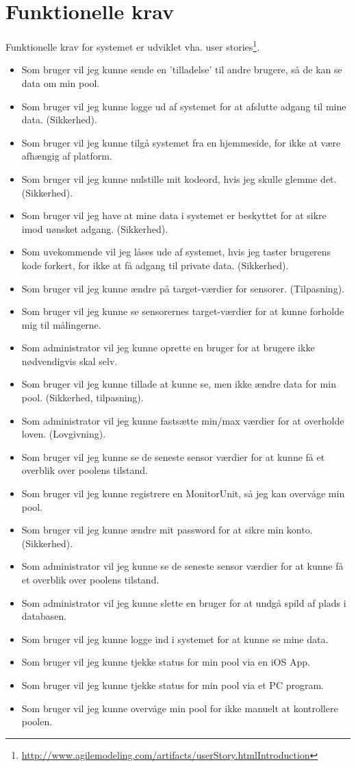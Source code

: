 \section{Funktionelle krav}
Funktionelle krav for systemet er udviklet vha. user stories\footnote{\url{http://www.agilemodeling.com/artifacts/userStory.htmlIntroduction}}.

\begin{itemize}
	\item Som bruger vil jeg kunne sende en ’tilladelse’ til andre brugere, så de kan se data om min pool.
	\item Som bruger vil jeg kunne logge ud af systemet for at afslutte adgang til mine data. (Sikkerhed).
	\item Som bruger vil jeg kunne tilgå systemet fra en hjemmeside, for ikke at være afhængig af platform.
	\item Som bruger vil jeg kunne nulstille mit kodeord, hvis jeg skulle glemme det. (Sikkerhed).
	\item Som bruger vil jeg have at mine data i systemet er beskyttet for at sikre imod uønsket adgang. (Sikkerhed).
	\item Som uvekommende vil jeg låses ude af systemet, hvis jeg taster brugerens kode forkert, for ikke at få adgang til private data. (Sikkerhed).
	\item Som bruger vil jeg kunne ændre på target-værdier for sensorer. (Tilpasning).
	\item Som bruger vil jeg kunne se sensorernes target-værdier for at kunne forholde mig til målingerne.
	\item Som administrator vil jeg kunne oprette en bruger for at brugere ikke nødvendigvis skal selv.
	\item Som bruger vil jeg kunne tillade at kunne se, men ikke ændre data for min pool. (Sikkerhed, tilpasning).
	\item Som administrator vil jeg kunne fastsætte min/max værdier for at overholde loven. (Lovgivning).
	\item Som bruger vil jeg kunne se de seneste sensor værdier for at kunne få et overblik over poolens tilstand.
	\item Som bruger vil jeg kunne registrere en MonitorUnit, så jeg kan overvåge min pool.
	\item Som bruger vil jeg kunne ændre mit password for at sikre min konto. (Sikkerhed).
	\item Som administrator vil jeg kunne se de seneste sensor værdier for at kunne få et overblik over poolens tilstand.
	\item Som administrator vil jeg kunne slette en bruger for at undgå spild af plads i databasen.
	\item Som bruger vil jeg kunne logge ind i systemet for at kunne se mine data.
	\item Som bruger vil jeg kunne tjekke status for min pool via en iOS App.
	\item Som bruger vil jeg kunne tjekke status for min pool via et PC program.
	\item Som bruger vil jeg kunne overvåge min pool for ikke manuelt at kontrollere poolen.
\end{itemize}

\newpage